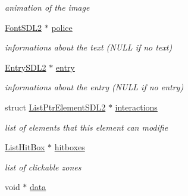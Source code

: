 \begin{DoxyCompactItemize}
\begin{DoxyCompactList}\small\item\em animation of the image \end{DoxyCompactList}\item 
\hyperlink{structFontSDL2}{Font\+S\+D\+L2} $\ast$ \hyperlink{structElementSDL2_a785d4fada0ba0ac6b5ce7a53c379f8cd}{police}\hypertarget{structElementSDL2_a785d4fada0ba0ac6b5ce7a53c379f8cd}{}\label{structElementSDL2_a785d4fada0ba0ac6b5ce7a53c379f8cd}

\begin{DoxyCompactList}\small\item\em informations about the text (N\+U\+LL if no text) \end{DoxyCompactList}\item 
\hyperlink{structEntrySDL2}{Entry\+S\+D\+L2} $\ast$ \hyperlink{structElementSDL2_a9c99c1c34dcf0e52baaca7a64598bd8a}{entry}\hypertarget{structElementSDL2_a9c99c1c34dcf0e52baaca7a64598bd8a}{}\label{structElementSDL2_a9c99c1c34dcf0e52baaca7a64598bd8a}

\begin{DoxyCompactList}\small\item\em informations about the entry (N\+U\+LL if no entry) \end{DoxyCompactList}\item 
struct \hyperlink{structListPtrElementSDL2}{List\+Ptr\+Element\+S\+D\+L2} $\ast$ \hyperlink{structElementSDL2_aca39f22199862196fc52dfcecafeca4a}{interactions}\hypertarget{structElementSDL2_aca39f22199862196fc52dfcecafeca4a}{}\label{structElementSDL2_aca39f22199862196fc52dfcecafeca4a}

\begin{DoxyCompactList}\small\item\em list of elements that this element can modifie \end{DoxyCompactList}\item 
\hyperlink{structListHitBox}{List\+Hit\+Box} $\ast$ \hyperlink{structElementSDL2_aa4af7ab8949d93544da609659a4011c0}{hitboxes}\hypertarget{structElementSDL2_aa4af7ab8949d93544da609659a4011c0}{}\label{structElementSDL2_aa4af7ab8949d93544da609659a4011c0}

\begin{DoxyCompactList}\small\item\em list of clickable zones \end{DoxyCompactList}\item 
void $\ast$ \hyperlink{structElementSDL2_abca7de78cc7e420d98d24a955563c7cc}{data}\hypertarget{structElementSDL2_abca7de78cc7e420d98d24a955563c7cc}{}\label{structElementSDL2_abca7de78cc7e420d98d24a955563c7cc}


\end{DoxyCompactItemize}
